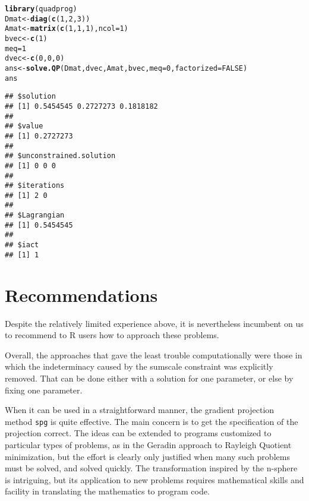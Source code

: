 \documentclass[11pt]{article}\usepackage[]{graphicx}\usepackage[]{color}
\makeatletter
\newcommand{\hlnum}[1]{\textcolor[rgb]{0.686,0.059,0.569}{#1}}%
\newcommand{\hlstd}[1]{\textcolor[rgb]{0.345,0.345,0.345}{#1}}%
\newcommand{\hlkwb}[1]{\textcolor[rgb]{0.69,0.353,0.396}{#1}}%
\newcommand{\hlkwc}[1]{\textcolor[rgb]{0.333,0.667,0.333}{#1}}%
\newcommand{\hlkwd}[1]{\textcolor[rgb]{0.737,0.353,0.396}{\textbf{#1}}}%
\newenvironment{kframe}{%
 \def\at@end@of@kframe{}%
 \ifinner\ifhmode%
  \def\at@end@of@kframe{\end{minipage}}%
  \begin{minipage}{\columnwidth}%
 \fi\fi%
 \def\FrameCommand##1{\hskip\@totalleftmargin \hskip-\fboxsep
 \colorbox{shadecolor}{##1}\hskip-\fboxsep
     \hskip-\linewidth \hskip-\@totalleftmargin \hskip\columnwidth}%
 \MakeFramed {\advance\hsize-\width
   \@totalleftmargin\z@ \linewidth\hsize
   \@setminipage}}%
 {\par\unskip\endMakeFramed%
 \at@end@of@kframe}
\newenvironment{knitrout}{}{} %
\newcommand{\R}{{\sf R }}
\newcommand{\code}[1]{{\tt#1}}
\makeatother
\begin{document}
\begin{knitrout}\scriptsize
{}\color{fgcolor}\begin{kframe}
\begin{alltt}
\hlkwd{library}\hlstd{(quadprog)}
\hlstd{Dmat}\hlkwb{<-}\hlkwd{diag}\hlstd{(}\hlkwd{c}\hlstd{(}\hlnum{1}\hlstd{,}\hlnum{2}\hlstd{,}\hlnum{3}\hlstd{))}
\hlstd{Amat}\hlkwb{<-}\hlkwd{matrix}\hlstd{(}\hlkwd{c}\hlstd{(}\hlnum{1}\hlstd{,} \hlnum{1}\hlstd{,} \hlnum{1}\hlstd{),} \hlkwc{ncol}\hlstd{=}\hlnum{1}\hlstd{)}
\hlstd{bvec}\hlkwb{<-}\hlkwd{c}\hlstd{(}\hlnum{1}\hlstd{)}
\hlstd{meq}\hlkwb{=}\hlnum{1}
\hlstd{dvec}\hlkwb{<-}\hlkwd{c}\hlstd{(}\hlnum{0}\hlstd{,} \hlnum{0}\hlstd{,} \hlnum{0}\hlstd{)}
\hlstd{ans}\hlkwb{<-}\hlkwd{solve.QP}\hlstd{(Dmat, dvec, Amat, bvec,} \hlkwc{meq}\hlstd{=}\hlnum{0}\hlstd{,} \hlkwc{factorized}\hlstd{=}\hlnum{FALSE}\hlstd{)}
\hlstd{ans}
\end{alltt}
\begin{verbatim}
## $solution
## [1] 0.5454545 0.2727273 0.1818182
## 
## $value
## [1] 0.2727273
## 
## $unconstrained.solution
## [1] 0 0 0
## 
## $iterations
## [1] 2 0
## 
## $Lagrangian
## [1] 0.5454545
## 
## $iact
## [1] 1
\end{verbatim}
\end{kframe}
\end{knitrout}

\section{Recommendations}

Despite the relatively limited experience above, it is nevertheless incumbent on us to 
recommend to \R  users how to approach these problems. 

Overall, the approaches that gave the least trouble computationally were those in 
which the indeterminacy caused by the sumscale constraint was explicitly removed.
That can be done either with a solution for one parameter, or else by fixing one
parameter. 

When it can be used in a straightforward manner, the gradient projection method
\code{spg} is quite effective. The main concern is to get the specification of
the projection correct. The ideas can be extended to programs customized to 
particular types of problems, as in the Geradin approach to Rayleigh Quotient
minimization, but the effort is clearly only justified when many such problems
must be solved, and solved quickly. The transformation inspired by the n-sphere
is intriguing, but its application to new problems requires mathematical skills
and facility in translating the mathematics to program code.
\end{document}
